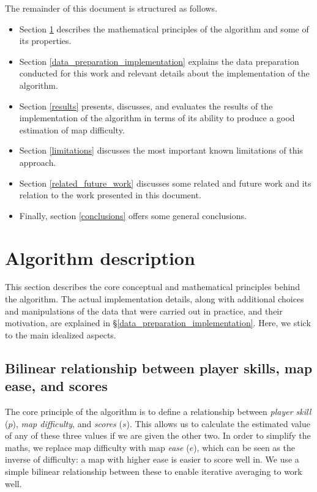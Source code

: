 \documentclass[12pt,a4paper]{article}
\begin{document}
The remainder of this document is structured as follows.

\begin{itemize}

\item Section \ref{algorithm_description} describes the mathematical principles of the algorithm and some of its properties.
\item Section \ref{data_preparation_implementation} explains the data preparation conducted for this work and relevant details about the implementation of the algorithm.
\item Section \ref{results} presents, discusses, and evaluates the results of the implementation of the algorithm in terms of its ability to produce a good estimation of map difficulty.
\item Section \ref{limitations} discusses the most important known limitations of this approach.
\item Section \ref{related_future_work} discusses some related and future work and its relation to the work presented in this document.
\item Finally, section \ref{conclusions} offers some general conclusions.

\end{itemize}

\section{Algorithm description}
\label{algorithm_description}

This section describes the core conceptual and mathematical principles behind the algorithm. The actual implementation details, along with additional choices and manipulations of the data that were carried out in practice, and their motivation, are explained in \S \ref{data_preparation_implementation}. Here, we stick to the main idealized aspects.\\

\subsection{Bilinear relationship between player skills, map ease, and scores}

The core principle of the algorithm is to define a relationship between {\emph{player skill}} ($p$), {\emph{map difficulty}}, and {\emph{scores}} ($s$). This allows us to calculate the estimated value of any of these three values if we are given the other two. In order to simplify the maths, we replace map difficulty with map {\emph{ease}} ($e$), which can be seen as the inverse of difficulty: a map with higher ease is easier to score well in. We use a simple bilinear relationship between these to enable iterative averaging to work well.\\
\end{document}
